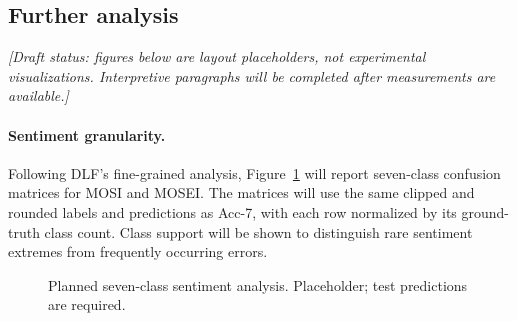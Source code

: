 \documentclass[review,12pt]{elsarticle}
\begin{document}
\begin{table}[t]
\centering
\caption{Planned modality and loss ablations on CMU-MOSI. Pending marks unmeasured entries.}
\label{tab:modal_loss}
\end{table}

\subsection{Further analysis}
\noindent\emph{[Draft status: figures below are layout placeholders, not experimental visualizations. Interpretive paragraphs will be completed after measurements are available.]}

\paragraph{Sentiment granularity.}
Following DLF's fine-grained analysis, Figure~\ref{fig:granularity} will report seven-class confusion matrices for MOSI and MOSEI. The matrices will use the same clipped and rounded labels and predictions as Acc-7, with each row normalized by its ground-truth class count. Class support will be shown to distinguish rare sentiment extremes from frequently occurring errors.

\begin{figure}[t]
\centering
{}
\caption{Planned seven-class sentiment analysis. Placeholder; test predictions are required.}
\label{fig:granularity}
\end{figure}
\end{document}
